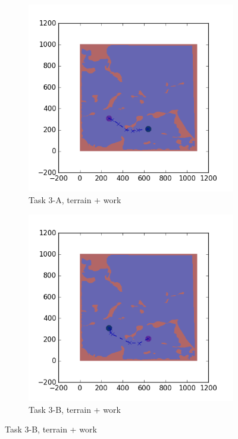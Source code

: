 \documentclass{tamuccthesis}
\begin{document}
\begin{figure}
    \begin{subfigure}[b]{0.4\textwidth}
        \centering
        \includegraphics[width=\textwidth,trim={4cm 3cm 2cm 3cm},clip]{EXP3RG_PathCa_-1_-1_-1_0.png}
        \caption{ Task 3-A, terrain + work}
        \label{fig:Path_3-A_terrain_work}
    \end{subfigure}
    \hfill
    \begin{subfigure}[b]{0.4\textwidth}  
        \centering 
        \includegraphics[width=\textwidth,trim={4cm 3cm 2cm 3cm},clip]{EXP3RG_PathCb_-1_-1_-1_0.png}
        \caption{\small Task 3-B, terrain + work}
        \label{fig:Path_3-B_terrain_work}
    \end{subfigure}


\end{figure}
\end{document}
